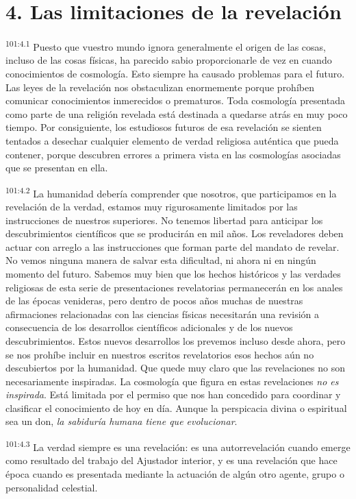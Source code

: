 \documentclass[twoside, 11pt]{book}
\begin{document}
\section*{4. Las limitaciones de la revelación}
\par
\textsuperscript{101:4.1} Puesto que vuestro mundo ignora generalmente el origen de las cosas, incluso de las cosas físicas, ha parecido sabio proporcionarle de vez en cuando conocimientos de cosmología. Esto siempre ha causado problemas para el futuro. Las leyes de la revelación nos obstaculizan enormemente porque prohíben comunicar conocimientos inmerecidos o prematuros. Toda cosmología presentada como parte de una religión revelada está destinada a quedarse atrás en muy poco tiempo. Por consiguiente, los estudiosos futuros de esa revelación se sienten tentados a desechar cualquier elemento de verdad religiosa auténtica que pueda contener, porque descubren errores a primera vista en las cosmologías asociadas que se presentan en ella.

\par
\textsuperscript{101:4.2} La humanidad debería comprender que nosotros, que participamos en la revelación de la verdad, estamos muy rigurosamente limitados por las instrucciones de nuestros superiores. No tenemos libertad para anticipar los descubrimientos científicos que se producirán en mil años. Los reveladores deben actuar con arreglo a las instrucciones que forman parte del mandato de revelar. No vemos ninguna manera de salvar esta dificultad, ni ahora ni en ningún momento del futuro. Sabemos muy bien que los hechos históricos y las verdades religiosas de esta serie de presentaciones revelatorias permanecerán en los anales de las épocas venideras, pero dentro de pocos años muchas de nuestras afirmaciones relacionadas con las ciencias físicas necesitarán una revisión a consecuencia de los desarrollos científicos adicionales y de los nuevos descubrimientos. Estos nuevos desarrollos los prevemos incluso desde ahora, pero se nos prohíbe incluir en nuestros escritos revelatorios esos hechos aún no descubiertos por la humanidad. Que quede muy claro que las revelaciones no son necesariamente inspiradas. La cosmología que figura en estas revelaciones \textit{no es inspirada}. Está limitada por el permiso que nos han concedido para coordinar y clasificar el conocimiento de hoy en día. Aunque la perspicacia divina o espiritual sea un don, \textit{la sabiduría humana tiene que evolucionar}.

\par
\textsuperscript{101:4.3} La verdad siempre es una revelación: es una autorrevelación cuando emerge como resultado del trabajo del Ajustador interior, y es una revelación que hace época cuando es presentada mediante la actuación de algún otro agente, grupo o personalidad celestial.
\end{document}
